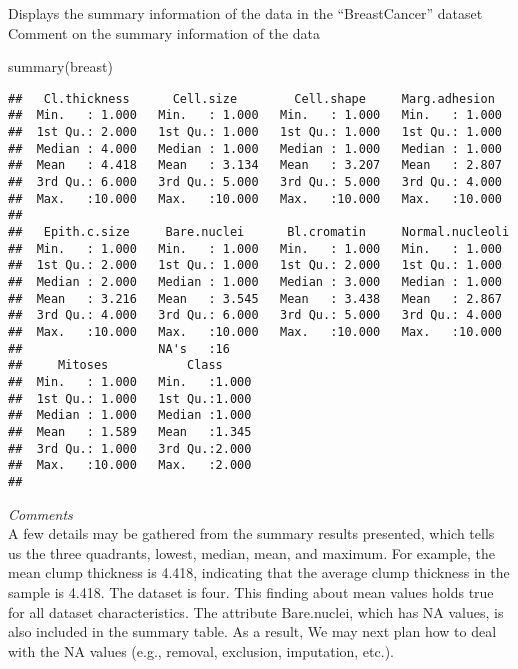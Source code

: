 \documentclass[
]{article}
\newenvironment{Shaded}{\begin{snugshade}}{\end{snugshade}}
\newcommand{\FunctionTok}[1]{\textcolor[rgb]{0.00,0.00,0.00}{#1}}
\newcommand{\NormalTok}[1]{#1}
\begin{document}
Displays the summary information of the data in the ``BreastCancer''
dataset\\
Comment on the summary information of the data\\

\begin{Shaded}
\begin{Highlighting}[]
\FunctionTok{summary}\NormalTok{(breast)}
\end{Highlighting}
\end{Shaded}

\begin{verbatim}
##   Cl.thickness      Cell.size        Cell.shape     Marg.adhesion   
##  Min.   : 1.000   Min.   : 1.000   Min.   : 1.000   Min.   : 1.000  
##  1st Qu.: 2.000   1st Qu.: 1.000   1st Qu.: 1.000   1st Qu.: 1.000  
##  Median : 4.000   Median : 1.000   Median : 1.000   Median : 1.000  
##  Mean   : 4.418   Mean   : 3.134   Mean   : 3.207   Mean   : 2.807  
##  3rd Qu.: 6.000   3rd Qu.: 5.000   3rd Qu.: 5.000   3rd Qu.: 4.000  
##  Max.   :10.000   Max.   :10.000   Max.   :10.000   Max.   :10.000  
##                                                                     
##   Epith.c.size     Bare.nuclei      Bl.cromatin     Normal.nucleoli 
##  Min.   : 1.000   Min.   : 1.000   Min.   : 1.000   Min.   : 1.000  
##  1st Qu.: 2.000   1st Qu.: 1.000   1st Qu.: 2.000   1st Qu.: 1.000  
##  Median : 2.000   Median : 1.000   Median : 3.000   Median : 1.000  
##  Mean   : 3.216   Mean   : 3.545   Mean   : 3.438   Mean   : 2.867  
##  3rd Qu.: 4.000   3rd Qu.: 6.000   3rd Qu.: 5.000   3rd Qu.: 4.000  
##  Max.   :10.000   Max.   :10.000   Max.   :10.000   Max.   :10.000  
##                   NA's   :16                                        
##     Mitoses           Class      
##  Min.   : 1.000   Min.   :1.000  
##  1st Qu.: 1.000   1st Qu.:1.000  
##  Median : 1.000   Median :1.000  
##  Mean   : 1.589   Mean   :1.345  
##  3rd Qu.: 1.000   3rd Qu.:2.000  
##  Max.   :10.000   Max.   :2.000  
## 
\end{verbatim}

\emph{Comments}\\
A few details may be gathered from the summary results presented, which
tells us the three quadrants, lowest, median, mean, and maximum. For
example, the mean clump thickness is 4.418, indicating that the average
clump thickness in the sample is 4.418. The dataset is four. This
finding about mean values holds true for all dataset characteristics.
The attribute Bare.nuclei, which has NA values, is also included in the
summary table. As a result, We may next plan how to deal with the NA
values (e.g., removal, exclusion, imputation, etc.).
\end{document}
